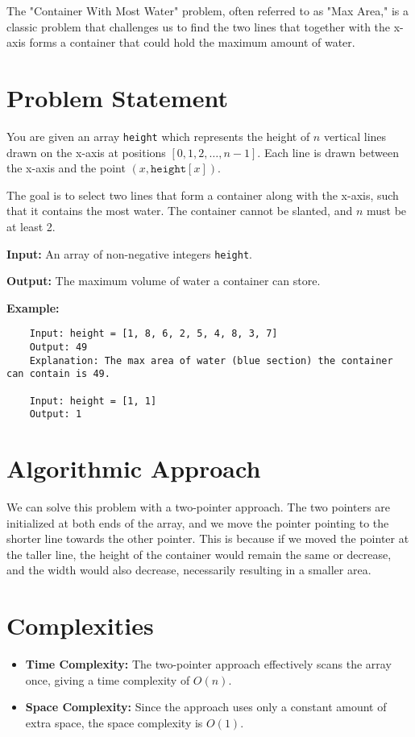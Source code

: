
\label{chap:Container_With_Most_Water}
The "Container With Most Water" problem, often referred to as "Max Area," is a classic problem that challenges us to find the two lines that together with the x-axis forms a container that could hold the maximum amount of water.

\section*{Problem Statement}
You are given an array \texttt{height} which represents the height of \( n \) vertical lines drawn on the x-axis at positions \([0, 1, 2, \ldots, n-1]\). Each line is drawn between the x-axis and the point \((x, \texttt{height}[x])\).

The goal is to select two lines that form a container along with the x-axis, such that it contains the most water. The container cannot be slanted, and \( n \) must be at least 2.

\textbf{Input:} An array of non-negative integers \texttt{height}.

\textbf{Output:} The maximum volume of water a container can store.

\textbf{Example:}

\begin{verbatim}
    Input: height = [1, 8, 6, 2, 5, 4, 8, 3, 7]
    Output: 49
    Explanation: The max area of water (blue section) the container can contain is 49.

    Input: height = [1, 1]
    Output: 1
\end{verbatim}


\section*{Algorithmic Approach}
We can solve this problem with a two-pointer approach. The two pointers are initialized at both ends of the array, and we move the pointer pointing to the shorter line towards the other pointer. This is because if we moved the pointer at the taller line, the height of the container would remain the same or decrease, and the width would also decrease, necessarily resulting in a smaller area.

\section*{Complexities}
\begin{itemize}
	\item \textbf{Time Complexity:} The two-pointer approach effectively scans the array once, giving a time complexity of \( O(n) \).
	\item \textbf{Space Complexity:} Since the approach uses only a constant amount of extra space, the space complexity is \( O(1) \).
\end{itemize}


